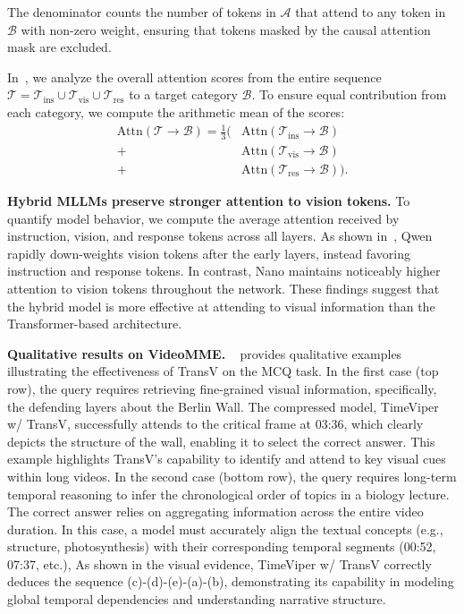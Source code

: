 \documentclass[10pt,twocolumn,letterpaper]{article}
\begin{document}
\noindent The denominator counts the number of tokens in $\mathcal{A}$ that attend to any token in $\mathcal{B}$ with non-zero weight, ensuring that tokens masked by the causal attention mask are excluded.



\vspace{4pt} \noindent In~, we analyze the overall attention scores from the entire sequence
$\mathcal{T} = \mathcal{T}_\text{ins} \cup \mathcal{T}_\text{vis} \cup \mathcal{T}_\text{res}$
to a target category $\mathcal{B}$.  To ensure equal contribution from each category, we compute the arithmetic mean of the scores:
\begin{equation}
\begin{aligned}
\text{Attn}(\mathcal{T} \!\to\! \mathcal{B})
=
\frac{1}{3}
\big(
& \text{Attn}(\mathcal{T}_\text{ins} \!\to\! \mathcal{B}) \\
+ & \text{Attn}(\mathcal{T}_\text{vis} \!\to\! \mathcal{B}) \\
+ & \text{Attn}(\mathcal{T}_\text{res} \!\to\! \mathcal{B})
\big).
\end{aligned}
\end{equation}


\noindent\textbf{Hybrid MLLMs preserve stronger attention to vision tokens.} 
To quantify model behavior, we compute the average attention received by instruction, vision, and response tokens across all layers.
As shown in~, Qwen rapidly down-weights vision tokens after the early layers, instead favoring instruction and response tokens.
In contrast, Nano maintains noticeably higher attention to vision tokens throughout the network.
These findings suggest that the hybrid model is more effective at attending to visual information than the Transformer-based architecture.



\noindent\textbf{Qualitative results on VideoMME.}
~ provides qualitative examples illustrating the effectiveness of TransV on the MCQ task.
In the first case (top row), the query requires retrieving fine-grained visual information, specifically, the defending layers about the Berlin Wall. 
The compressed model, TimeViper w/ TransV, successfully attends to the critical frame at 03:36, which clearly depicts the structure of the wall, enabling it to select the correct answer. 
This example highlights TransV's capability to identify and attend to key visual cues within long videos.
In the second case (bottom row), the query requires long-term temporal reasoning to infer the chronological order of topics in a biology lecture. 
The correct answer relies on aggregating information across the entire video duration. 
In this case, a model must accurately align the textual concepts (e.g., structure, photosynthesis) with their corresponding temporal segments (00:52, 07:37, etc.), 
As shown in the visual evidence, TimeViper w/ TransV correctly deduces the sequence (c)-(d)-(e)-(a)-(b), demonstrating its capability in modeling global temporal dependencies and understanding narrative structure.
\end{document}
